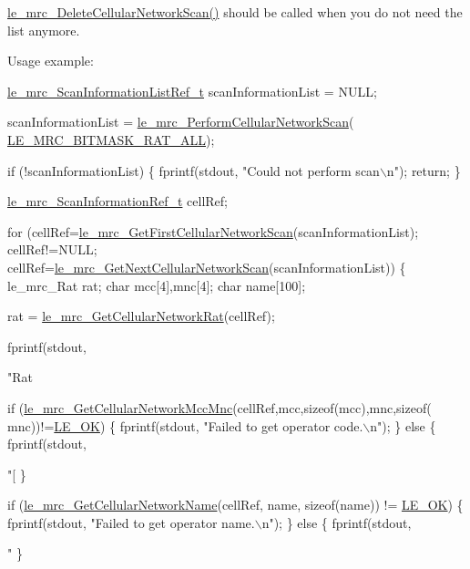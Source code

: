 \hyperlink{le__mrc__interface_8h_ac45ce335b3fa063b83bb925e67eeaeb3}{le\+\_\+mrc\+\_\+\+Delete\+Cellular\+Network\+Scan()} should be called when you do not need the list anymore.

Usage example\+: 
\begin{DoxyCode}
\hyperlink{le__mrc__interface_8h_a25a9e79cc9078e22cec22444fd959c61}{le\_mrc\_ScanInformationListRef\_t} scanInformationList = NULL;

scanInformationList = \hyperlink{le__mrc__interface_8h_ab4a246dd466fa8175aca0158e0cab227}{le\_mrc\_PerformCellularNetworkScan}(
      \hyperlink{le__mrc__interface_8h_af643c7005da7f2466302eebdf7a29d93aa6e87ad274b7f5011413ea0e8375300b}{LE\_MRC\_BITMASK\_RAT\_ALL});

\textcolor{keywordflow}{if} (!scanInformationList)
\{
    fprintf(stdout, \textcolor{stringliteral}{"Could not perform scan\(\backslash\)n"});
    \textcolor{keywordflow}{return};
\}

\hyperlink{le__mrc__interface_8h_a3e7fe3e0d8f10fe7853f00eb254529ea}{le\_mrc\_ScanInformationRef\_t} cellRef;

\textcolor{keywordflow}{for} (cellRef=\hyperlink{le__mrc__interface_8h_ae006d053b037cec589aa85053472a2af}{le\_mrc\_GetFirstCellularNetworkScan}(scanInformationList);
     cellRef!=NULL;
     cellRef=\hyperlink{le__mrc__interface_8h_ae0ca9f0c1c106d6ddeef784c6bb0d69b}{le\_mrc\_GetNextCellularNetworkScan}(scanInformationList))
\{
    le\_mrc\_Rat rat;
    \textcolor{keywordtype}{char} mcc[4],mnc[4];
    \textcolor{keywordtype}{char} name[100];

    rat = \hyperlink{le__mrc__interface_8h_ad33fbe1d2b7acee0e47f3e54cab78274}{le\_mrc\_GetCellularNetworkRat}(cellRef);

    fprintf(stdout, \textcolor{stringliteral}{"Rat %

    \textcolor{keywordflow}{if} (\hyperlink{le__mrc__interface_8h_af4fa2d3f3c9a664b8e46478dba048f2e}{le\_mrc\_GetCellularNetworkMccMnc}(cellRef,mcc,\textcolor{keyword}{sizeof}(mcc),mnc,\textcolor{keyword}{sizeof}(
      mnc))!=\hyperlink{le__basics_8h_a1cca095ed6ebab24b57a636382a6c86ca5066a4bcec691c6b67843b8f79656422}{LE\_OK})
    \{
        fprintf(stdout, \textcolor{stringliteral}{"Failed to get operator code.\(\backslash\)n"});
    \}
    \textcolor{keywordflow}{else}
    \{
        fprintf(stdout, \textcolor{stringliteral}{"[%
    \}

    \textcolor{keywordflow}{if} (\hyperlink{le__mrc__interface_8h_a82cb12c5f02baccbb04b0af1be4eb031}{le\_mrc\_GetCellularNetworkName}(cellRef, name, \textcolor{keyword}{sizeof}(name)) != 
      \hyperlink{le__basics_8h_a1cca095ed6ebab24b57a636382a6c86ca5066a4bcec691c6b67843b8f79656422}{LE\_OK})
    \{
        fprintf(stdout, \textcolor{stringliteral}{"Failed to get operator name.\(\backslash\)n"});
    \}
    \textcolor{keywordflow}{else}
    \{
        fprintf(stdout, \textcolor{stringliteral}{"%
    \}

}}}
\end{DoxyCode}

